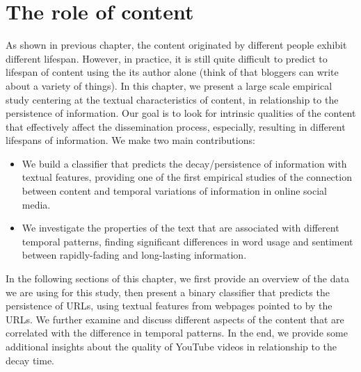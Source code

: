 \documentclass[phd,tocprelim]{cornell}
\begin{document}


\chapter{The role of content}
\label{chap:content}
As shown in previous chapter, the content originated by different people exhibit different lifespan. However, in practice, it is still quite difficult to predict to lifespan of content using the its author alone (think of that bloggers can write about a variety of things). In this chapter, we present a large scale empirical study centering at the textual characteristics of content, in relationship to the persistence of information. Our goal is to look for intrinsic qualities of the content that effectively affect the dissemination process, especially, resulting in different lifespans of information. We make two main contributions:
\begin{itemize}
\item We build a classifier that predicts the decay/persistence of information with textual features, providing one of the first empirical studies of the connection between content and temporal variations of information in online social media.
\item We investigate the properties of the text that are associated
with different temporal patterns, finding significant differences in
word usage and sentiment between rapidly-fading and long-lasting information.
\end{itemize}

In the following sections of this chapter, we first provide an overview of the data we are using for this study, then present a binary classifier that predicts the persistence of URLs, using textual features from webpages pointed to by the URLs. We further examine and discuss different aspects of the content that are correlated with the difference in temporal patterns. In the end, we provide some additional insights about the quality of YouTube videos in relationship to the decay time.
\end{document}
